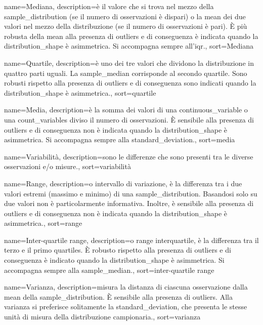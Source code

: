 {
	 name={Mediana},
	 description={\`e il valore che si trova nel mezzo della \gls{sample_distribution} (se il numero di osservazioni \`e dispari) o la \gls{mean} dei due valori nel mezzo della distribuzione (se il numero di osservazioni \`e pari). \`E pi\`u robusta della \gls{mean} alla presenza di \gls{outliers} e di conseguenza \`e indicata quando la \gls{distribution_shape} \`e asimmetrica. Si accompagna sempre all'\gls{iqr}.},
	 sort={Mediana}
}

{
	 name={Quartile},
	 description={\`e uno dei tre valori che dividono la distribuzione in quattro parti uguali. La \gls{sample_median} corrisponde al secondo quartile. Sono robusti rispetto alla presenza di \gls{outliers} e di conseguenza sono indicati quando la \gls{distribution_shape} \`e asimmetrica.},
	 sort={quartile}
}

{
	 name={Media},
	 description={\`e la somma dei valori di una \gls{continuous_variable} o una \gls{count_variables} diviso il numero di osservazioni. \`E sensibile alla presenza di \gls{outliers} e di conseguenza non \`e indicata quando la \gls{distribution_shape} \`e asimmetrica. Si accompagna sempre alla \gls{standard_deviation}.},
	 sort={media}
}

{
	 name={Variabilit\`a},
	 description={sono le differenze che sono presenti tra le diverse osservazioni e/o misure.},
	 sort={variabilit\`a}
}

{
	 name={Range},
	 description={o intervallo di variazione, \`e la differenza tra i due valori estremi (massimo e minimo) di una \gls{sample_distribution}. Basandosi solo su due valori non \`e particolarmente informativa. Inoltre, \`e sensibile alla presenza di \gls{outliers} e di conseguenza non \`e indicata quando la \gls{distribution_shape} \`e asimmetrica.},
	 sort={range}
}

{
	 name={Inter-quartile range},
	 description={o range interquartile, \`e la differenza tra il terzo e il primo \gls{quartiles}. \`E robusto rispetto alla presenza di \gls{outliers} e di conseguenza \`e indicato quando la \gls{distribution_shape} \`e asimmetrica. Si accompagna sempre alla \gls{sample_median}.},
	 sort={inter-quartile range}
}

{
	 name={Varianza},
	 description={misura la distanza di ciascuna osservazione dalla \gls{mean} della  \gls{sample_distribution}. \`E sensibile alla presenza di \gls{outliers}. Alla varianza si preferisce solitamente la \gls{standard_deviation}, che presenta le stesse unit\`a di misura della distribuzione campionaria.},
	 sort={varianza}
}


